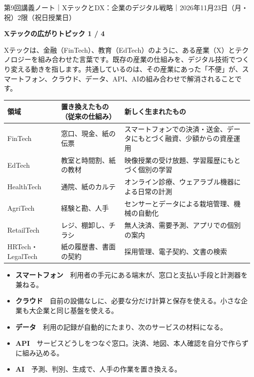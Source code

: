 \documentclass[paper=a4paper,fontsize=10pt,line_length=170mm,number_of_lines=46,baselineskip=1.6zw]{jlreq}
\newcommand\topichead[4]{%
  {\sffamily\footnotesize\color{grayt}#1\par}\vspace{1.5mm}
  {\sffamily\bfseries\LARGE #4}\hfill\colorbox{accent}{\sffamily\footnotesize\bfseries トピック #2 / #3}\par
  \vspace{1.2mm}{\color{ink}\hrule height 0.6pt}\vspace{3mm}}
\newcommand\subhead[1]{\par\vspace{2.6mm}{\sffamily\bfseries\large #1}\par\vspace{1.3mm}}
\begin{document}
\topichead{第9回講義ノート｜XテックとDX：企業のデジタル戦略｜2026年11月23日（月・祝）2限（祝日授業日）}{1}{4}{Xテックの広がり}
Xテックは、金融（FinTech）、教育（EdTech）のように、ある産業（X）とテクノロジーを組み合わせた言葉です。既存の産業の仕組みを、デジタル技術でつくり変える動きを指します。共通しているのは、その産業にあった「不便」が、スマートフォン、クラウド、データ、API、AIの組み合わせで解消されることです。\par\vspace{1.2mm}
\subhead{代表的な領域}
\begin{center}\small\renewcommand{\arraystretch}{1.15}\setlength{\tabcolsep}{1.5mm}
\begin{tabular}{|p{24.0mm}|p{68.0mm}|p{68.0mm}|}\arrayrulecolor{rulec}\hline
\rowcolor{papertwo}\sffamily\bfseries 領域 & \sffamily\bfseries 置き換えたもの（従来の仕組み） & \sffamily\bfseries 新しく生まれたもの\\\hline
FinTech & 窓口、現金、紙の伝票 & スマートフォンでの決済・送金、データにもとづく融資、少額からの資産運用\\\hline
EdTech & 教室と時間割、紙の教材 & 映像授業の受け放題、学習履歴にもとづく個別の学習\\\hline
HealthTech & 通院、紙のカルテ & オンライン診療、ウェアラブル機器による日常の計測\\\hline
AgriTech & 経験と勘、人手 & センサーとデータによる栽培管理、機械の自動化\\\hline
RetailTech & レジ、棚卸し、チラシ & 無人決済、需要予測、アプリでの個別の案内\\\hline
HRTech・LegalTech & 紙の履歴書、書面の契約 & 採用管理、電子契約、文書の検索\\\hline
\end{tabular}\end{center}\vspace{0.5mm}
\subhead{共通する要素}
\begin{itemize}[leftmargin=1.5em,itemsep=0.6mm,topsep=0.3mm]
\item {\sffamily\bfseries スマートフォン}　利用者の手元にある端末が、窓口と支払い手段と計測器を兼ねる。
\item {\sffamily\bfseries クラウド}　自前の設備なしに、必要な分だけ計算と保存を使える。小さな企業も大企業と同じ基盤を使える。
\item {\sffamily\bfseries データ}　利用の記録が自動的にたまり、次のサービスの材料になる。
\item {\sffamily\bfseries API}　サービスどうしをつなぐ窓口。決済、地図、本人確認を自分で作らずに組み込める。
\item {\sffamily\bfseries AI}　予測、判別、生成で、人手の作業を置き換える。
\end{itemize}\vspace{0.8mm}
\end{document}
